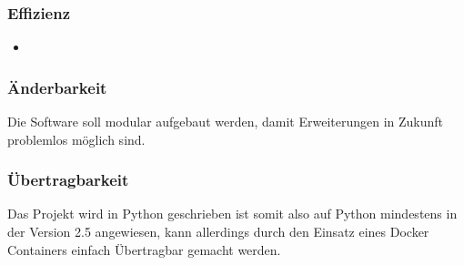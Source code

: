 \documentclass[11pt]{scrartcl}
\begin{document}
\subsubsection{Effizienz}
\begin{itemize}
  \item 
\end{itemize}
\subsubsection{Änderbarkeit}
Die Software soll modular aufgebaut werden, damit Erweiterungen in Zukunft 
problemlos möglich sind.
\subsubsection{Übertragbarkeit}
Das Projekt wird in Python geschrieben ist somit also auf Python mindestens in der Version 2.5 angewiesen, 
kann allerdings durch den Einsatz eines Docker Containers einfach Übertragbar 
gemacht werden.
\end{document}

